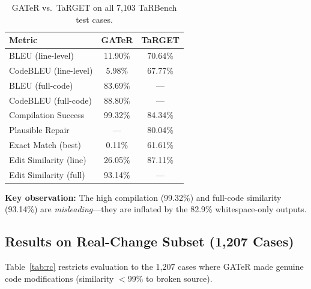 \documentclass[conference,10pt]{IEEEtran}
\begin{document}
\begin{table}[h]
\centering
\caption{GATeR vs.\ TaRGET on all 7{,}103 TaRBench test cases.}
\label{tab:full}
\begin{tabular}{lcc}
\toprule
\textbf{Metric} & \textbf{GATeR} & \textbf{TaRGET} \\
\midrule
BLEU (line-level)          &  11.90\%  &  70.64\% \\
CodeBLEU (line-level)      &   5.98\%  &  67.77\% \\
BLEU (full-code)           &  83.69\%  &    ---   \\
CodeBLEU (full-code)       &  88.80\%  &    ---   \\
Compilation Success        &  99.32\%  &  84.34\% \\
Plausible Repair           &    ---    &  80.04\% \\
Exact Match (best)         &   0.11\%  &  61.61\% \\
Edit Similarity (line)     &  26.05\%  &  87.11\% \\
Edit Similarity (full)     &  93.14\%  &    ---   \\
\bottomrule
\end{tabular}
\end{table}

\textbf{Key observation:} The high compilation (99.32\%) and
full-code similarity (93.14\%) are \emph{misleading}---they are
inflated by the 82.9\% whitespace-only outputs.

\subsection{Results on Real-Change Subset (1{,}207 Cases)}

Table~\ref{tab:rc} restricts evaluation to the 1{,}207 cases where
GATeR made genuine code modifications (similarity $<$99\% to broken
source).
\end{document}
